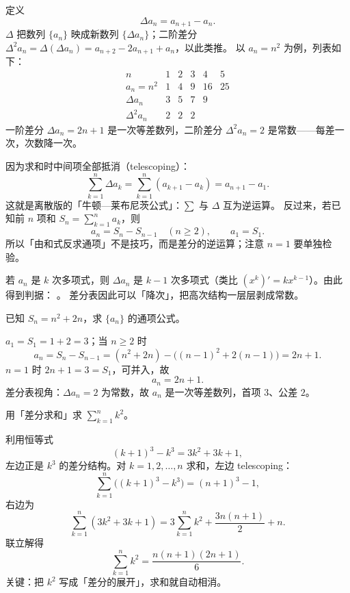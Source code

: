 \begin{explore}

定义
\[
  \Delta a_n=a_{n+1}-a_n .
\]
$\Delta$ 把数列 $\{a_n\}$ 映成新数列 $\{\Delta a_n\}$；二阶差分 $\Delta^2a_n=\Delta(\Delta a_n)=a_{n+2}-2a_{n+1}+a_n$，以此类推。
以 $a_n=n^2$ 为例，列表如下：
\[
\begin{array}{c|ccccc}
  n & 1 & 2 & 3 & 4 & 5 \\ \hline
  a_n=n^2 & 1 & 4 & 9 & 16 & 25 \\
  \Delta a_n & 3 & 5 & 7 & 9 & \\
  \Delta^2a_n & 2 & 2 & 2 & &
\end{array}
\]
一阶差分 $\Delta a_n=2n+1$ 是一次等差数列，二阶差分 $\Delta^2a_n=2$ 是常数——每差一次，次数降一次。

因为求和时中间项全部抵消（telescoping）：
\[
  \sum_{k=1}^{n}\Delta a_k=\sum_{k=1}^{n}(a_{k+1}-a_k)=a_{n+1}-a_1 .
\]
这就是离散版的「牛顿—莱布尼茨公式」：$\sum$ 与 $\Delta$ 互为逆运算。
反过来，若已知前 $n$ 项和 $S_n=\sum_{k=1}^na_k$，则
\[
  a_n=S_n-S_{n-1}\quad(n\ge2),\qquad a_1=S_1 .
\]
所以「由和式反求通项」不是技巧，而是差分的逆运算；注意 $n=1$ 要单独检验。

若 $a_n$ 是 $k$ 次多项式，则 $\Delta a_n$ 是 $k-1$ 次多项式（类比 $(x^k)'=kx^{k-1}$）。由此得到判据：
。
差分表因此可以「降次」，把高次结构一层层剥成常数。

\begin{example}
已知 $S_n=n^2+2n$，求 $\{a_n\}$ 的通项公式。
\end{example}
\begin{solution}
$a_1=S_1=1+2=3$；当 $n\ge2$ 时
\[
  a_n=S_n-S_{n-1}=(n^2+2n)-\bigl((n-1)^2+2(n-1)\bigr)=2n+1 .
\]
$n=1$ 时 $2n+1=3=S_1$，可并入，故
\[
  a_n=2n+1 .
\]
差分表视角：$\Delta a_n=2$ 为常数，故 $a_n$ 是一次等差数列，首项 $3$、公差 $2$。
\end{solution}

\begin{example}
用「差分求和」求 $\sum_{k=1}^nk^2$。
\end{example}
\begin{solution}
利用恒等式
\[
  (k+1)^3-k^3=3k^2+3k+1 ,
\]
左边正是 $k^3$ 的差分结构。对 $k=1,2,\dots,n$ 求和，左边 telescoping：
\[
  \sum_{k=1}^n\bigl((k+1)^3-k^3\bigr)=(n+1)^3-1 ,
\]
右边为
\[
  \sum_{k=1}^n(3k^2+3k+1)=3\sum_{k=1}^nk^2+\frac{3n(n+1)}2+n .
\]
联立解得
\[
  \sum_{k=1}^nk^2=\frac{n(n+1)(2n+1)}6 .
\]
关键：把 $k^2$ 写成「差分的展开」，求和就自动相消。
\end{solution}


\end{explore}
